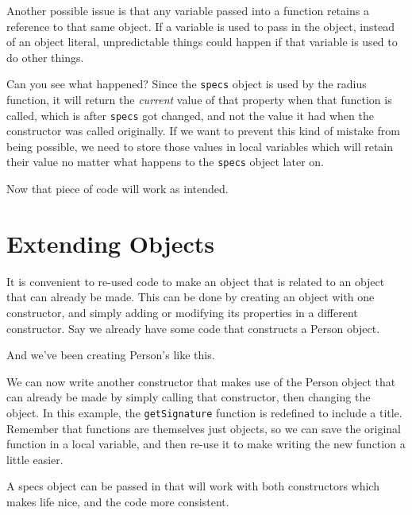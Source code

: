 
Another possible issue is that any variable passed into a function retains a reference to that same object. If a variable is used to pass in the object, instead of an object literal, unpredictable things could happen if that variable is used to do other things.


Can you see what happened? Since the \texttt{specs} object is used by the radius function, it will return the \textit{current} value of that property when that function is called, which is after \texttt{specs} got changed, and not the value it had when the constructor was called originally. If we want to prevent this kind of mistake from being possible, we need to store those values in local variables which will retain their value no matter what happens to the \texttt{specs} object later on.


Now that piece of code will work as intended.

\section{Extending Objects}

It is convenient to re-used code to make an object that is related to an object that can already be made. This can be done by creating an object with one constructor, and simply adding or modifying its properties in a different constructor. Say we already have some code that constructs a Person object.


And we've been creating Person's like this.


We can now write another constructor that makes use of the Person object that can already be made by simply calling that constructor, then changing the object. In this example, the \texttt{getSignature} function is redefined to include a title. Remember that functions are themselves just objects, so we can save the original function in a local variable, and then re-use it to make writing the new function a little easier.


A specs object can be passed in that will work with both constructors which makes life nice, and the code more consistent.

